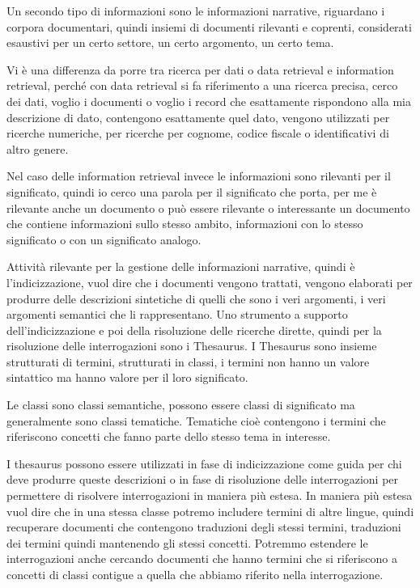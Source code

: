 Un secondo tipo di informazioni sono le informazioni narrative, riguardano i corpora documentari, quindi insiemi di documenti rilevanti e coprenti, considerati esaustivi per un certo settore, un certo argomento, un certo tema.

Vi è una differenza da porre tra ricerca per dati o data retrieval e information retrieval, perché con data retrieval si fa riferimento a una ricerca precisa, cerco dei dati, voglio i documenti o voglio i record che esattamente rispondono alla mia descrizione di dato, contengono esattamente quel dato, vengono utilizzati per ricerche numeriche, per ricerche per cognome, codice fiscale o identificativi di altro genere.

Nel caso delle information retrieval invece le informazioni sono rilevanti per il significato, quindi io cerco una parola per il significato che porta, per me è rilevante anche un documento o può essere rilevante o interessante un documento che contiene informazioni sullo stesso ambito, informazioni con lo stesso significato o con un significato analogo.

Attività rilevante per la gestione delle informazioni narrative, quindi è l'indicizzazione, vuol dire che i documenti vengono trattati, vengono elaborati per produrre delle descrizioni sintetiche di quelli che sono i veri argomenti, i veri argomenti semantici che li rappresentano.
Uno strumento a supporto dell'indicizzazione e poi della risoluzione delle ricerche dirette, quindi per la risoluzione delle interrogazioni sono i Thesaurus.
I Thesaurus sono insieme strutturati di termini, strutturati in classi, i termini non hanno un valore sintattico ma hanno valore per il loro significato.

Le classi sono classi semantiche, possono essere classi di significato ma generalmente sono classi tematiche.
Tematiche cioè contengono i termini che riferiscono concetti che fanno parte dello stesso tema in interesse.

I thesaurus possono essere utilizzati in fase di indicizzazione come guida per chi deve produrre queste descrizioni o in fase di risoluzione delle interrogazioni per permettere di risolvere interrogazioni in maniera più estesa.
In maniera più estesa vuol dire che in una stessa classe potremo includere termini di altre lingue, quindi recuperare documenti che contengono traduzioni degli stessi termini, traduzioni dei termini quindi mantenendo gli stessi concetti.
Potremmo estendere le interrogazioni anche cercando documenti che hanno termini che si riferiscono a concetti di classi contigue a quella che abbiamo riferito nella interrogazione.

